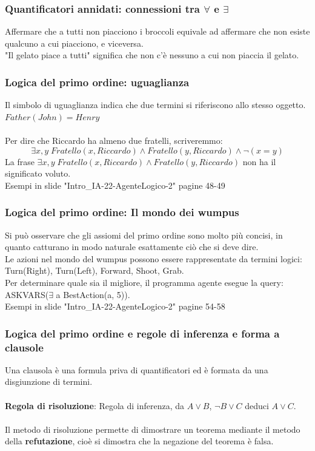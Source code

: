 \documentclass[../main.tex]{subfiles}
\begin{document}
	\subsubsection{Quantificatori annidati: connessioni tra $\forall$ e $\exists$}
	Affermare che a tutti non piacciono i broccoli equivale ad affermare che non esiste qualcuno a cui piacciono, e viceversa.\\
	"Il gelato piace a tutti" significa che non c'è nessuno a cui non piaccia il gelato.
	\subsubsection{Logica del primo ordine: uguaglianza}
	Il simbolo di uguaglianza indica che due termini si riferiscono allo stesso oggetto.\\
	$Father (John)=Henry$\\\\
	Per dire che Riccardo ha almeno due fratelli, scriveremmo:
	\[\exists x,y \; Fratello(x,Riccardo) \wedge Fratello(y,Riccardo) \wedge \neg (x=y)\]
	La frase $\exists x,y \; Fratello(x,Riccardo) \wedge Fratello(y,Riccardo)$ non ha il significato voluto.\\
	{\color{red} Esempi in slide "Intro\_IA-22-AgenteLogico-2" pagine 48-49}
	\subsubsection{Logica del primo ordine: Il mondo dei wumpus}
	Si può osservare che gli assiomi del primo ordine sono molto più concisi, in quanto catturano in modo naturale esattamente ciò che si deve dire. \\
	Le azioni nel mondo del wumpus possono essere rappresentate da termini logici: Turn(Right), Turn(Left), Forward, Shoot, Grab.\\
	Per determinare quale sia il migliore, il programma agente esegue la query: ASKVARS($\exists$ a BestAction(a, 5)). \\
	{\color{red} Esempi in slide "Intro\_IA-22-AgenteLogico-2" pagine 54-58}
	\subsubsection{Logica del primo ordine e regole di inferenza e forma a clausole}
	Una clausola è una formula priva di quantificatori ed è formata da una disgiunzione di termini.\\\\
	\textbf{Regola di risoluzione}: Regola di inferenza, da $A \vee B$, $¬B \vee C$ deduci $A\vee C$.\\\\
	Il metodo di risoluzione permette di dimostrare un teorema mediante il metodo della \textbf{refutazione}, cioè si dimostra che la negazione del teorema è falsa.
\end{document}
